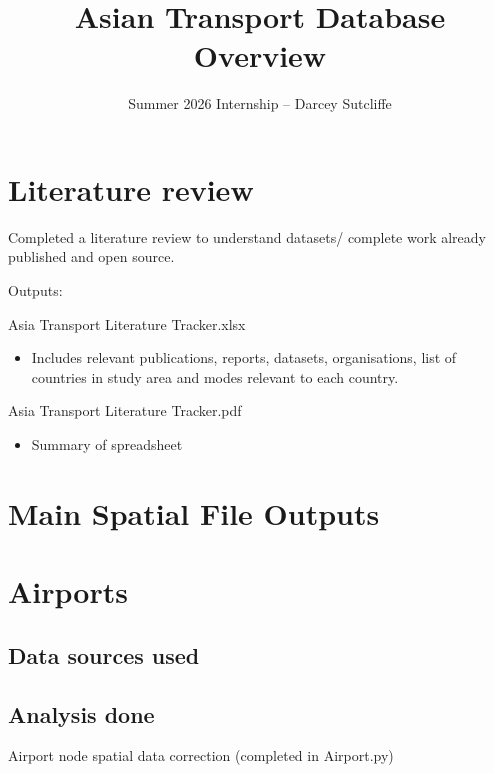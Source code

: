 \documentclass[11pt,a4paper]{article}
\title{Asian Transport Database Overview}
\author{Summer 2026 Internship -- Darcey Sutcliffe}
\date{}
\begin{document}
\maketitle
\tableofcontents
\newpage


\section{Literature review}

Completed a literature review to understand datasets/ complete work already published and open source.\par

Outputs:\par

Asia Transport Literature Tracker.xlsx\par

\begin{itemize}
\item Includes relevant publications, reports, datasets, organisations, list of countries in study area and modes relevant to each country.
\end{itemize}

Asia Transport Literature Tracker.pdf\par

\begin{itemize}
\item Summary of spreadsheet
\end{itemize}

\section{Main Spatial File Outputs}

\section{Airports}

\subsection{Data sources used}

\subsection{Analysis done}

Airport node spatial data correction (completed in Airport.py)\par
\end{document}
